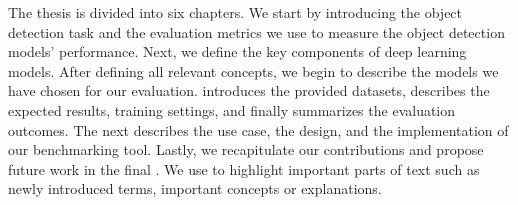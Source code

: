 The thesis is divided into six chapters. We start by introducing the object
detection task and the evaluation metrics we use to measure the object detection
models' performance. Next, we define the key components of deep learning models.
After defining all relevant concepts, we begin to describe the models we have
chosen for our evaluation.  introduces the
provided datasets, describes the expected
results, training settings, and finally summarizes the evaluation outcomes. The
next  describes the use case, the design, and the
implementation of our benchmarking tool. Lastly, we recapitulate our
contributions and propose future work in the final
. We use  to highlight important
parts of text such as newly introduced terms, important concepts or explanations.

